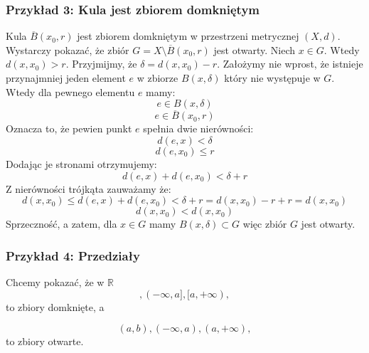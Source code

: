 \documentclass{article}
\begin{document}
\subsubsection{Przykład 3: Kula jest zbiorem domkniętym}

Kula \(\overline{B}(x_0 , r)\) jest zbiorem domkniętym w przestrzeni metrycznej \((X, d)\).
Wystarczy pokazać, że zbiór \(G = X \setminus \overline{B}(x_0 , r)\)
jest otwarty. Niech \(x \in G\). Wtedy \(d(x, x_0) > r\). Przyjmijmy, że \(\delta = d(x, x_0) - r\). 
Założymy nie wprost, że istnieje przynajmniej jeden element \(e\)
w zbiorze \(B(x, \delta)\) który nie występuje w \(G\). Wtedy dla pewnego elementu \(e\) mamy:
\begin{equation*}
    e \in B(x , \delta)
\end{equation*}
\begin{equation*}
    e \in \overline{B}(x_0 , r)
\end{equation*}
Oznacza to, że pewien punkt \(e\) spełnia dwie nierówności:
\begin{equation*}
    d(e, x) < \delta
\end{equation*}
\begin{equation*}
    d(e, x_0) \leq r 
\end{equation*}
Dodając je stronami otrzymujemy:
\begin{equation*}
    d(e, x) + d(e, x_0) < \delta + r
\end{equation*}
Z nierówności trójkąta zauważamy że:
\begin{equation*}
    d(x, x_0) \leq d(e, x) + d(e, x_0) < \delta + r = d(x, x_0) - r + r = d(x, x_0)
\end{equation*}
\begin{equation*}
    d(x, x_0) < d(x, x_0)
\end{equation*}
Sprzeczność, a zatem, dla \(x \in G\) mamy \(B(x, \delta) \subset G\) więc zbiór \(G\) jest otwarty.

\subsubsection{Przykład 4: Przedziały}

Chcemy pokazać, że w \(\mathbb{R}\)
\begin{equation*}
    [a,b], (- \infty, a], [a, + \infty),
\end{equation*}
to zbiory domknięte, a 

\begin{equation*}
    (a, b), (- \infty, a), (a, + \infty),
\end{equation*}
to zbiory otwarte.
\end{document}
